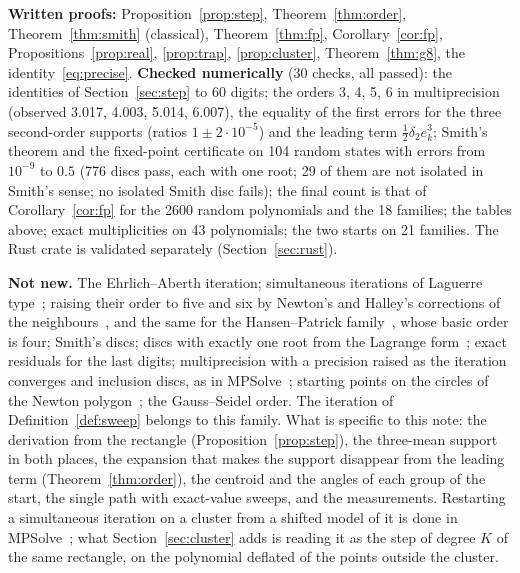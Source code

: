 \documentclass[10pt,a4paper]{article}
\theoremstyle{definition}
\numberwithin{equation}{section}
\begin{document}
\textbf{Written proofs:} Proposition~\ref{prop:step}, Theorem~\ref{thm:order},
Theorem~\ref{thm:smith} (classical), Theorem~\ref{thm:fp}, Corollary~\ref{cor:fp},
Propositions~\ref{prop:real}, \ref{prop:trap}, \ref{prop:cluster}, Theorem~\ref{thm:g8}, the
identity~\eqref{eq:precise}.
\textbf{Checked numerically} (30 checks, all passed): the identities of
Section~\ref{sec:step} to 60 digits; the orders 3, 4, 5, 6 in multiprecision (observed 3.017, 4.003,
5.014, 6.007), the equality of the first errors for the three second-order supports (ratios
$1\pm2\cdot10^{-5}$) and the leading term $\frac12\delta_2e_k^3$; Smith's theorem and the fixed-point
certificate on 104 random states with errors from $10^{-9}$ to $0.5$ (776 discs pass, each with one
root; 29 of them are not isolated in Smith's sense; no isolated Smith disc fails); the final count is
that of Corollary~\ref{cor:fp} for the 2600 random polynomials and the 18 families; the tables above;
exact multiplicities on 43 polynomials; the two starts on 21 families. The Rust crate is validated
separately (Section~\ref{sec:rust}).

\textbf{Not new.} The Ehrlich--Aberth iteration; simultaneous iterations of Laguerre type~\cite{hpr};
raising their order to five and six by Newton's and Halley's corrections of the
neighbours~\cite{nourein,ppz}, and the same for the Hansen--Patrick family~\cite{hp,prp}, whose basic
order is four; Smith's discs; discs with exactly one root from the Lagrange form~\cite{bs,bh}; exact
residuals for the last digits; multiprecision with a precision raised as the iteration converges and
inclusion discs, as in MPSolve~\cite{mpsolve}; starting points on the circles of the Newton
polygon~\cite{bini}; the Gauss--Seidel order. The iteration of Definition~\ref{def:sweep} belongs to
this family. What is specific to this note: the derivation from the rectangle
(Proposition~\ref{prop:step}), the three-mean support in both places, the expansion that makes the
support disappear from the leading term (Theorem~\ref{thm:order}), the centroid and the angles of each
group of the start, the single path with exact-value sweeps, and the measurements. Restarting a
simultaneous iteration on a cluster from a shifted model of it is done in MPSolve~\cite{mpsolve}; what
Section~\ref{sec:cluster} adds is reading it as the step of degree $K$ of the same rectangle, on the
polynomial deflated of the points outside the cluster.
\end{document}
